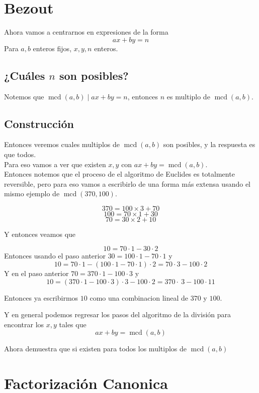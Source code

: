 \documentclass[11pt]{scrartcl}
\newcommand{\mcd}{\operatorname{mcd}}
\begin{document}
\section{Bezout}

Ahora vamos a centrarnos en expresiones de la forma
\[ax+by=n\]
Para $a,b$ enteros fijos, $x,y,n$ enteros. \\
\subsection{¿Cu\'ales $n$ son posibles?}
Notemos que $\mcd(a,b) \mid ax+by =n $, entonces $n$ es multiplo de $\mcd(a,b)$. 

\subsection{Construcci\'on}
Entonces veremos cuales multiplos de $\mcd(a,b)$ son posibles, y la respuesta es que todos. \\
Para eso vamos a ver que existen $x,y$ con $ax+by=\mcd(a,b)$. \\
Entonces notemos que el proceso de el algoritmo de Euclides es totalmente reversible, pero para eso vamos a escribirlo de una forma m\'as extensa usando el mismo ejemplo de $\mcd(370,100)$. 

\[370 = 100 \times 3 + 70\]
\[100 = 70 \times 1 + 30\]
\[70 = 30 \times 2 +10 \]

Y entonces veamos que 

\[10 = 70\cdot 1 - 30 \cdot 2\]
Entonces usando el paso anterior $30=100 \cdot 1- 70 \cdot 1$ y 
\[10 = 70\cdot 1 - (100 \cdot 1-70\cdot 1)\cdot 2 = 70 \cdot 3 -100 \cdot 2\]
Y en el paso anterior $70=370\cdot 1 -100 \cdot 3$ y 
\[10 = (370 \cdot 1 - 100 \cdot 3) \cdot 3 - 100 \cdot 2 = 370 \cdot\ 3 - 100 \cdot 11 \]

Entonces ya escribirmos $10$ como una combinacion lineal de $370$ y $100$.

Y en general podemos regresar los pasos del algoritmo de la divisi\'on para encontrar los $x,y$ tales que 
\[ax+by = \mcd (a,b) \]

\begin{exercise} Ahora demuestra que si existen para todos los multiplos de $\mcd(a,b)$ \end{exercise}


\section{Factorización Canonica}
\end{document}
